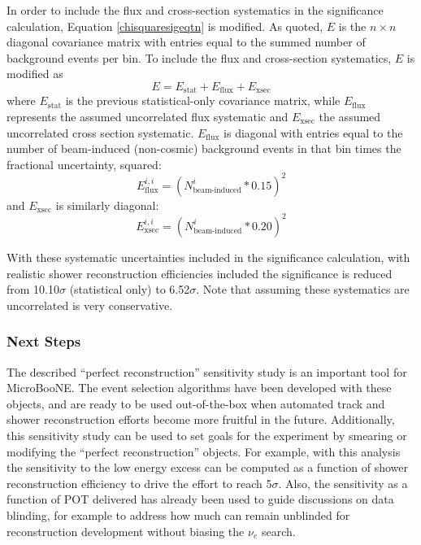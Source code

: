 In order to include the flux and cross-section systematics in the significance calculation, Equation \ref{chisquaresigeqtn} is modified. As quoted, $E$ is the $n\times n$ diagonal covariance matrix with entries equal to the summed number of background events per bin. To include the flux and cross-section systematics, $E$ is modified as
\begin{equation}\label{LEE_emtx_systematics}
E = E_{\text{stat}} + E_{\text{flux}} + E_{\text{xsec}}
\end{equation}
where $E_{\text{stat}}$ is the previous statistical-only covariance matrix, while $E_{\text{flux}}$ represents the assumed uncorrelated flux systematic and $E_{\text{xsec}}$ the assumed uncorrelated cross section systematic. $E_{\text{flux}}$ is diagonal with entries equal to the number of beam-induced (non-cosmic) background events in that bin times the fractional uncertainty, squared:
\begin{equation}\label{LEE_flux_emtx}
E_{\text{flux}}^{i,i} = (N_{\text{beam-induced}}^i*0.15)^2
\end{equation}
and $E_{\text{xsec}}$ is similarly diagonal:
\begin{equation}\label{LEE_xsec_emtx}
E_{\text{xsec}}^{i,i} = (N_{\text{beam-induced}}^i*0.20)^2
\end{equation}

With these systematic uncertainties included in the significance calculation, with realistic shower reconstruction efficiencies included the significance is reduced from 10.10$\sigma$ (statistical only) to 6.52$\sigma$. Note that assuming these systematics are uncorrelated is very conservative.

\subsubsection{Next Steps}
The described ``perfect reconstruction'' sensitivity study is an important tool for MicroBooNE. The event selection algorithms have been developed with these objects, and are ready to be used out-of-the-box when automated track and shower reconstruction efforts become more fruitful in the future. Additionally, this sensitivity study can be used to set goals for the experiment by smearing or modifying the ``perfect reconstruction'' objects. For example, with this analysis the sensitivity to the low energy excess can be computed as a function of shower reconstruction efficiency to drive the effort to reach 5$\sigma$. Also, the sensitivity as a function of POT delivered has already been used to guide discussions on data blinding, for example to address how much can remain unblinded for reconstruction development without biasing the $\nu_e$ search.\\

